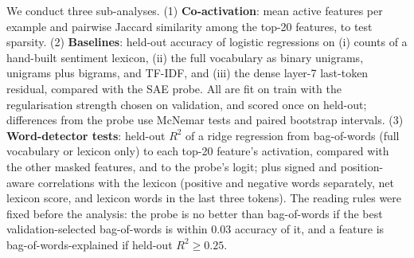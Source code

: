 We conduct three sub-analyses. (1) \textbf{Co-activation}: mean active features per example and pairwise Jaccard similarity among the top-20 features, to test sparsity. (2) \textbf{Baselines}: held-out accuracy of logistic regressions on (i) counts of a hand-built sentiment lexicon, (ii) the full vocabulary as binary unigrams, unigrams plus bigrams, and TF-IDF, and (iii) the dense layer-7 last-token residual, compared with the SAE probe. All are fit on train with the regularisation strength chosen on validation, and scored once on held-out; differences from the probe use McNemar tests and paired bootstrap intervals. (3) \textbf{Word-detector tests}: held-out $R^2$ of a ridge regression from bag-of-words (full vocabulary or lexicon only) to each top-20 feature's activation, compared with the other masked features, and to the probe's logit; plus signed and position-aware correlations with the lexicon (positive and negative words separately, net lexicon score, and lexicon words in the last three tokens). The reading rules were fixed before the analysis: the probe is no better than bag-of-words if the best validation-selected bag-of-words is within $0.03$ accuracy of it, and a feature is bag-of-words-explained if held-out $R^2\ge0.25$.


